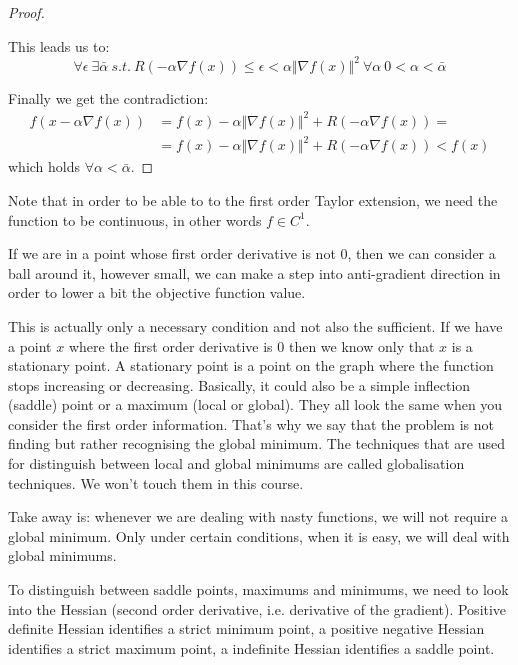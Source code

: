 \begin{proof}
\begin{equation}
\end{equation}
\par This leads us to:
\begin{equation}
    \forall\epsilon\ \exists\bar{\alpha}\ s.t.\ R(-\alpha\nabla f(x)) \leq \epsilon < \alpha \Vert \nabla f(x) \Vert^2\ \forall \alpha\ 0 < \alpha < \bar{\alpha}
\end{equation}
\par Finally we get the contradiction:
\begin{equation}
\begin{split}
    f(x-\alpha\nabla f(x)) &= f(x) - \alpha \Vert \nabla f(x) \Vert^2 + R(-\alpha\nabla f(x)) = \\
    &= f(x) - \alpha \Vert \nabla f(x) \Vert^2 + R(-\alpha\nabla f(x)) < f(x)
\end{split}
\end{equation}
which holds $\forall \alpha < \bar{\alpha}$.
\end{proof}
\par Note that in order to be able to to the first order Taylor extension, we need the function to be continuous, in other words $f \in C^1$.
\par If we are in a point whose first order derivative is not 0, then we can consider a ball around it, however small, we can make a step into anti-gradient direction in order to lower a bit the objective function value.
\par This is actually only a necessary condition and not also the sufficient. If we have a point $x$ where the first order derivative is 0 then we know only that $x$ is a stationary point. A stationary point is a point on the graph where the function stops increasing or decreasing. Basically, it could also be a simple inflection (saddle) point or a maximum (local or global). They all look the same when you consider the first order information. That's why we say that the problem is not finding but rather recognising the global minimum. The techniques that are used for distinguish between local and global minimums are called globalisation techniques. We won't touch them in this course.
\par Take away is: whenever we are dealing with nasty functions, we will not require a global minimum. Only under certain conditions, when it is easy, we will deal with global minimums.
\par To distinguish between saddle points, maximums and minimums, we need to look into the Hessian (second order derivative, i.e. derivative of the gradient). Positive definite Hessian identifies a strict minimum point, a positive negative Hessian identifies a strict maximum point, a indefinite Hessian identifies a saddle point.
